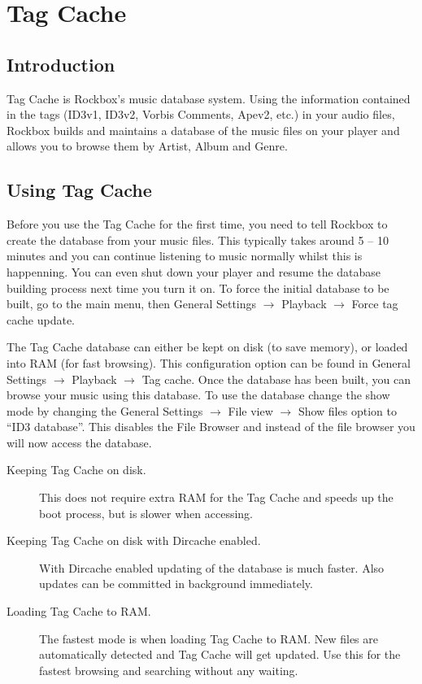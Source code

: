 \section{Tag Cache\label{ref:tagcache}} 

\subsection{Introduction}
Tag Cache is Rockbox's music database system. Using the information 
contained in the tags (ID3v1, ID3v2, Vorbis Comments, Apev2, etc.) in your 
audio files, Rockbox builds and maintains a database of the music files on 
your player and allows you to browse them by Artist, Album and Genre.

\subsection{Using Tag Cache}
Before you use the Tag Cache for the first time, you need to tell Rockbox to
create the database from your music files. This typically takes around 
5 -- 10 minutes and you can continue listening to music normally whilst 
this is happenning. You can even shut down your player and resume the 
database building process next time you turn it on.
To force the initial database to be built, go to the main menu, then 
General Settings $\rightarrow$ Playback $\rightarrow$ Force tag cache update.

The Tag Cache database can either be kept on disk (to save memory), or 
loaded into RAM (for fast browsing). This configuration option can be 
found in General Settings $\rightarrow$ Playback $\rightarrow$ Tag cache.
Once the database has been built, you can browse your music using this 
database. To use the database change the show mode by changing the 
General Settings $\rightarrow$ File view $\rightarrow$ Show files option to 
``ID3 database''. This disables the File Browser and instead of the file
browser you will now access the database.
%
\begin{description}
\item[Keeping Tag Cache on disk.] This does not require extra RAM for the
Tag Cache and speeds up the boot process, but is slower when accessing.
\item[Keeping Tag Cache on disk with Dircache enabled.] With Dircache
enabled updating of the database is much faster. Also updates can be
committed in background immediately.
\item[Loading Tag Cache to RAM.] The fastest mode is when loading Tag Cache
to RAM. New files are automatically detected and Tag Cache will get updated.
Use this for the fastest browsing and searching without any waiting.
\end{description}

